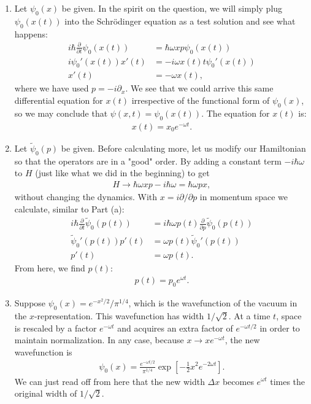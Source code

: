 \documentclass{article}
\theoremstyle{definition}
\newcommand{\p}{\partial}
\newcommand{\f}[2]{\frac{#1}{#2}}
\newcommand{\lb}{\left[}
\newcommand{\rb}{\right]}
\begin{document}
\begin{enumerate}[label=(\alph*)]

\item Let $\psi_0(x)$ be given. In the spirit on the question, we will simply plug $\psi_0(x(t))$ into the Schr\"{o}dinger equation as a test solution and see what happens:
\begin{align*}
i\hbar \f{\p}{\p t} \psi_0(x(t)) &= \hbar \omega x p \psi_0(x(t))  \\
i \psi_0'(x(t)) x'(t) &= -i \omega  x(t)t \psi_0'(x(t)) \\
x'(t) &= - \omega x(t),
\end{align*}
where we have used $p = -i\p_x$. We see that we could arrive this same differential equation for $x(t)$ irrespective of the functional form of $\psi_0(x)$, so we may conclude that $\psi(x,t) = \psi_0(x(t))$. The equation for $x(t)$ is:
\begin{align*}
x(t) = x_0 e^{-\omega t}. 
\end{align*}




\item Let $\tilde{\psi}_0(p)$ be given. Before calculating more, let us modify our Hamiltonian so that the operators are in a "good" order. By adding a constant term $-i\hbar \omega$ to $H$ (just like what we did in the beginning) to get 
\begin{align*}
H \to \hbar\omega xp - i\hbar\omega = \hbar\omega px,
\end{align*}
without changing the dynamics.  With $x = i \p/\p p$ in momentum space we calculate, similar to Part (a):
\begin{align*}
i\hbar \f{\p}{\p t} \tilde{\psi}_0(p(t)) &= i \hbar \omega p(t) \f{\p}{\p p}  \tilde{\psi}_0(p(t))  \\
\tilde{\psi}_0'(p(t)) p'(t) &=  \omega p(t)\tilde{\psi}_0'(p(t))   \\
p'(t) &= \omega p(t).
\end{align*}
From here, we find $p(t)$:
\begin{align*}
p(t) = p_0 e^{\omega t}.
\end{align*}

\item Suppose $\psi_0(x) = e^{-x^2/2} / \pi^{1/4}$, which is the wavefunction of the vacuum in the $x$-representation. This wavefunction has width $1/\sqrt{2}$. At a time $t$, space is rescaled by a factor $e^{-\omega t}$ and acquires an extra factor of $e^{-\omega t/2}$ in order to maintain normalization. In any case, because $x \to x e^{-\omega t}$, the new wavefunction is 
\begin{align*}
\psi_0(x)= \f{e^{-\omega t/2}}{\pi^{1/4}} \exp\lb -\f{1}{2} x^2 e^{-2\omega t}  \rb. 
\end{align*}
We can just read off from here that the new width $\Delta x$ becomes $e^{\omega t}$ times the original width of $1/\sqrt{2}$. 



\end{enumerate}
\end{document}

